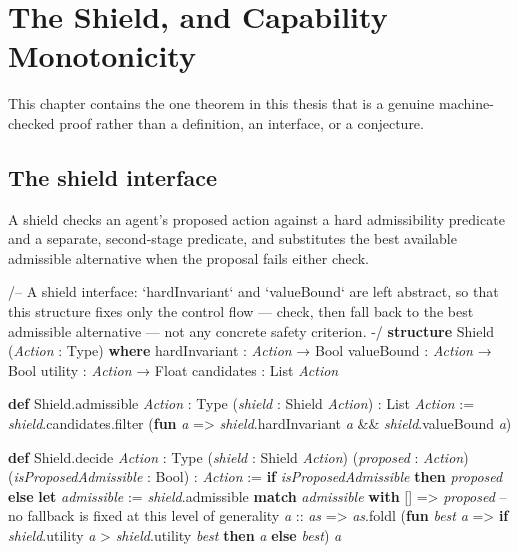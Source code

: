 \documentclass{memoir}
\begin{document}
\chapter{The Shield, and Capability Monotonicity}\label{Capability--Monotonicity--in--a--Formal--Skeleton--for--Agentic--AI--Safety----The--Shield-005F-005F-005F--and--Capability--Monotonicity}

This chapter contains the one theorem in this thesis that is a genuine
machine-checked proof rather than a definition, an interface, or a
conjecture.



\section{The shield interface}\label{Capability--Monotonicity--in--a--Formal--Skeleton--for--Agentic--AI--Safety----The--Shield-005F-005F-005F--and--Capability--Monotonicity----The--shield--interface}

A shield checks an agent's proposed action against a hard admissibility
predicate and a separate, second-stage predicate, and substitutes the best
available admissible alternative when the proposal fails either check.

\begin{LeanVerbatim}
/-- A shield interface: `hardInvariant` and `valueBound` are left abstract,
so that this structure fixes only the control flow — check, then fall back
to the best admissible alternative — not any concrete safety criterion. -/
\textbf{structure} Shield (\textit{Action} : Type) \textbf{where}
  hardInvariant : \textit{Action} → Bool
  valueBound    : \textit{Action} → Bool
  utility       : \textit{Action} → Float
  candidates    : List \textit{Action}

\textbf{def} Shield.admissible \textit{Action} : Type (\textit{shield} : Shield \textit{Action}) : List \textit{Action} :=
  \textit{shield}.candidates.filter (\textbf{fun} \textit{a} => \textit{shield}.hardInvariant \textit{a} && \textit{shield}.valueBound \textit{a})

\textbf{def} Shield.decide \textit{Action} : Type (\textit{shield} : Shield \textit{Action}) (\textit{proposed} : \textit{Action})
    (\textit{isProposedAdmissible} : Bool) : \textit{Action} :=
  \textbf{if} \textit{isProposedAdmissible} \textbf{then} \textit{proposed}
  \textbf{else}
    \textbf{let} \textit{admissible} := \textit{shield}.admissible
    \textbf{match} \textit{admissible} \textbf{with}
     []      => \textit{proposed}  -- no fallback is fixed at this level of generality
     \textit{a} :: \textit{as} =>
      \textit{as}.foldl (\textbf{fun} \textit{best} \textit{a} =>
        \textbf{if} \textit{shield}.utility \textit{a} > \textit{shield}.utility \textit{best} \textbf{then} \textit{a} \textbf{else} \textit{best}) \textit{a}

\end{LeanVerbatim}
\end{document}
